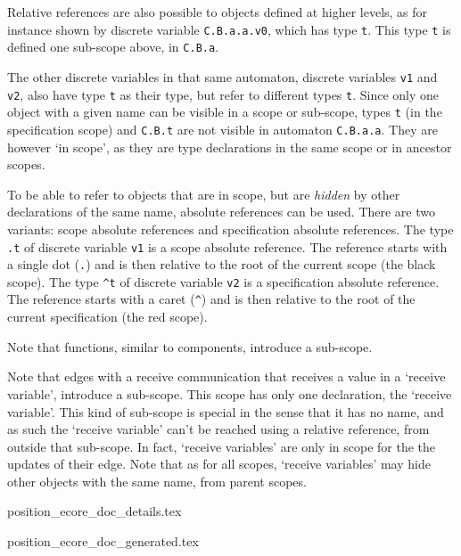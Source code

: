 \documentclass{report}
\begin{document}
Relative references are also possible to objects defined at higher levels,
as for instance shown by discrete variable \texttt{C.B.a.a.v0}, which has type
\texttt{t}. This type \texttt{t} is defined one sub-scope above, in
\texttt{C.B.a}.

The other discrete variables in that same automaton, discrete variables
\texttt{v1} and
\texttt{v2}, also have type \texttt{t} as their type, but refer to different
types \texttt{t}. Since only one object with a given name can be visible in
a scope or sub-scope, types \texttt{t} (in the specification scope) and
\texttt{C.B.t} are not visible in automaton \texttt{C.B.a.a}. They are however
`in scope', as they are type declarations in the same scope or in ancestor
scopes.

To be able to refer to objects that are in scope, but are \emph{hidden} by
other declarations of the same name, absolute references can be used. There
are two variants: scope absolute references and specification absolute
references. The type \texttt{.t} of discrete variable \texttt{v1} is a scope
absolute
reference. The reference starts with a single dot (\texttt{.}) and is then
relative to the root of the current scope (the black scope). The type
\texttt{\^{}t} of discrete variable \texttt{v2} is a specification absolute
reference. The reference starts with a caret (\texttt{\^}) and is then
relative to the root of the current specification (the red scope).

Note that functions, similar to components, introduce a sub-scope.

Note that edges with a receive communication that receives a value in a
`receive variable', introduce a sub-scope. This scope has only one declaration,
the `receive variable'. This kind of sub-scope is special in the sense that
it has no name, and as such the `receive variable' can't be reached using a
relative reference, from outside that sub-scope. In fact, `receive variables'
are only in scope for the the updates of their edge. Note that as for all
scopes, `receive variables' may hide other objects with the same name, from
parent scopes.


\newpage


       {position_ecore_doc_details.tex}



       {position_ecore_doc_generated.tex}

\end{document}
